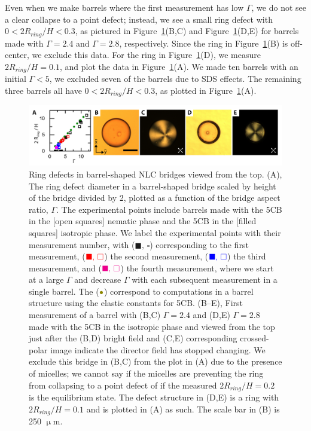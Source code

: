 Even when we make barrels where the first measurement has low $\Gamma$, we do not see a clear collapse to a point defect; instead, we see a small ring defect with $0 < 2 R_{ring}/H < 0.3$, as pictured in Figure~\ref{f:5-ExpBarrelRing}(B,C) and Figure~\ref{f:5-ExpBarrelRing}(D,E) for barrels made with $\Gamma = 2.4$ and $\Gamma = 2.8$, respectively.
Since the ring in Figure~\ref{f:5-ExpBarrelRing}(B) is off-center, we exclude this data.
For the ring in Figure~\ref{f:5-ExpBarrelRing}(D), we measure $2 R_{ring}/H =0.1$, and plot the data in Figure~\ref{f:5-ExpBarrelRing}(A).
We made ten barrels with an initial $\Gamma < 5$, we excluded seven of the barrels due to SDS effects.
The remaining three barrels all have $0 < 2 R_{ring}/H < 0.3$, as plotted in Figure~\ref{f:5-ExpBarrelRing}(A).
\begin{figure}
  \centering
  \includegraphics{figures/C5/Ch5-Figs_ExpBarrelRing.png}
  \caption{Ring defects in barrel-shaped NLC bridges viewed from the top.
  (A), The ring defect diameter in a barrel-shaped bridge scaled by height of the bridge divided by 2, plotted as a function of the bridge aspect ratio, $\Gamma$.
  The experimental points include barrels made with the 5CB in the [open squares] nematic phase and the 5CB in the [filled squares] isotropic phase.
  We label the experimental points with their measurement number, with (${\blacksquare,\, \square}$) corresponding to the first measurement, (${\color{red} \blacksquare,\, \square}$) the second measurement, (${\color{blue} \blacksquare,\, \square}$) the third measurement, and (${\color{magenta} \blacksquare,\, \square}$) the fourth measurement, where we start at a large $\Gamma$ and decrease $\Gamma$ with each subsequent measurement in a single barrel.
  The (${\color{olive} \bullet}$) correspond to computations in a barrel structure using the elastic constants for 5CB.\@
  (B--E), First measurement of a barrel with (B,C) $\Gamma = 2.4$ and (D,E) $\Gamma = 2.8$ made with the 5CB in the isotropic phase and viewed from the top just after the (B,D) bright field and (C,E) corresponding crossed-polar image indicate the director field has stopped changing.
  We exclude this bridge in (B,C) from the plot in (A) due to the presence of micelles; we cannot say if the micelles are preventing the ring from collapsing to a point defect of if the measured $2 R_{ring}/H = 0.2$ is the equilibrium state.
  The defect structure in (D,E) is a ring with $2 R_{ring}/H = 0.1$ and is plotted in (A) as such.
  The scale bar in (B) is 250 $\upmu$m.}\label{f:5-ExpBarrelRing}
\end{figure}




